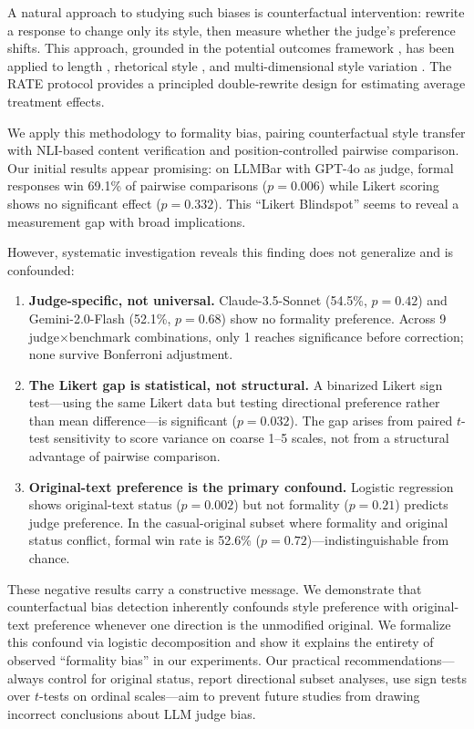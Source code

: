 \documentclass[11pt,a4paper]{article}
\begin{document}
A natural approach to studying such biases is counterfactual intervention: rewrite a response to change only its style, then measure whether the judge's preference shifts. This approach, grounded in the potential outcomes framework \citep{rubin2005causal}, has been applied to length \citep{dubois2024alpacaeval}, rhetorical style \citep{counterfactual_rhetorical2025}, and multi-dimensional style variation \citep{casse2026}. The RATE protocol \citep{rate2025} provides a principled double-rewrite design for estimating average treatment effects.

We apply this methodology to formality bias, pairing counterfactual style transfer with NLI-based content verification and position-controlled pairwise comparison. Our initial results appear promising: on LLMBar with GPT-4o as judge, formal responses win 69.1\% of pairwise comparisons ($p=0.006$) while Likert scoring shows no significant effect ($p=0.332$). This ``Likert Blindspot'' seems to reveal a measurement gap with broad implications.

However, systematic investigation reveals this finding does not generalize and is confounded:

\begin{enumerate}
    \item \textbf{Judge-specific, not universal.} Claude-3.5-Sonnet (54.5\%, $p=0.42$) and Gemini-2.0-Flash (52.1\%, $p=0.68$) show no formality preference. Across 9 judge$\times$benchmark combinations, only 1 reaches significance before correction; none survive Bonferroni adjustment.
    \item \textbf{The Likert gap is statistical, not structural.} A binarized Likert sign test---using the same Likert data but testing directional preference rather than mean difference---is significant ($p=0.032$). The gap arises from paired $t$-test sensitivity to score variance on coarse 1--5 scales, not from a structural advantage of pairwise comparison.
    \item \textbf{Original-text preference is the primary confound.} Logistic regression shows original-text status ($p=0.002$) but not formality ($p=0.21$) predicts judge preference. In the casual-original subset where formality and original status conflict, formal win rate is 52.6\% ($p=0.72$)---indistinguishable from chance.
\end{enumerate}

These negative results carry a constructive message. We demonstrate that counterfactual bias detection inherently confounds style preference with original-text preference whenever one direction is the unmodified original. We formalize this confound via logistic decomposition and show it explains the entirety of observed ``formality bias'' in our experiments. Our practical recommendations---always control for original status, report directional subset analyses, use sign tests over $t$-tests on ordinal scales---aim to prevent future studies from drawing incorrect conclusions about LLM judge bias.
\end{document}
